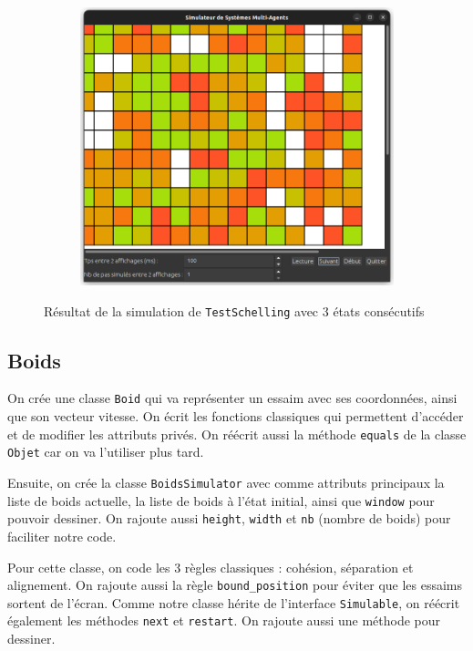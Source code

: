 \documentclass[a4paper, 11pt, french]{article}
\begin{document}
\begin{figure}[H]
\begin{subfigure}{0.3\textwidth}
\end{subfigure}
\hfill
\begin{subfigure}{0.3\textwidth}
    \includegraphics[width=\textwidth]{TestSchelling3.png}
\end{subfigure}
\caption{Résultat de la simulation de \texttt{TestSchelling} avec 3 états consécutifs}
\end{figure}

\subsection{Boids}

On crée une classe \verb|Boid| qui va représenter un essaim avec ses coordonnées, ainsi que son vecteur vitesse. On écrit les fonctions classiques qui permettent d'accéder et de modifier les attributs privés. On réécrit aussi la méthode \verb|equals| de la classe \verb|Objet| car on va l'utiliser plus tard.

Ensuite, on crée la classe \verb|BoidsSimulator| avec comme attributs principaux la liste de boids actuelle, la liste de boids à l'état initial, ainsi que \verb|window| pour pouvoir dessiner. On rajoute aussi \verb|height|, \verb|width| et \verb|nb| (nombre de boids) pour faciliter notre code. 

Pour cette classe, on code les 3 règles classiques : cohésion, séparation et alignement. On rajoute aussi la règle \verb|bound_position| pour éviter que les essaims sortent de l'écran. Comme notre classe hérite de l'interface \verb|Simulable|, on réécrit également les méthodes \verb|next| et \verb|restart|. On rajoute aussi une méthode pour dessiner.
\end{document}
